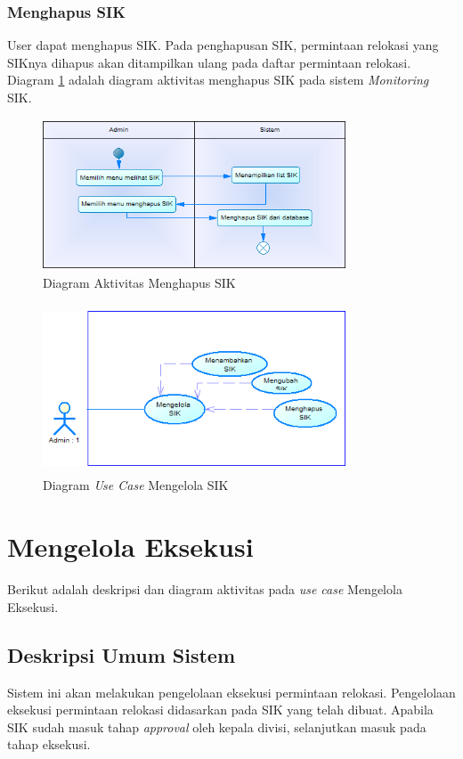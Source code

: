 	\subsubsection{Menghapus SIK}
	User dapat menghapus SIK. Pada penghapusan SIK, permintaan relokasi yang SIKnya dihapus akan ditampilkan ulang pada daftar permintaan relokasi. Diagram \ref{figure:activity_menghapus_sik} adalah diagram aktivitas menghapus SIK pada sistem \textit{Monitoring } SIK.
	\begin{figure}[h]
	\centerline {\includegraphics[width=9cm,height=4.5cm]{bab4/ActivityDiagram_MenghapusSIK.png}}
	\caption{Diagram Aktivitas Menghapus SIK}
	\label{figure:activity_menghapus_sik}
	\end{figure}		

	\begin{figure}[h]
	\centerline {\includegraphics[width=9cm,height=5cm]{bab4/use-case-mengelola-sik.png}}
	\caption{Diagram \textit{Use Case} Mengelola SIK}
	\label{figure:use_case_mengelola_sik}
	\end{figure}

\section{Mengelola Eksekusi}
Berikut adalah deskripsi dan diagram aktivitas pada \textit{use case} Mengelola Eksekusi.
\subsection{Deskripsi Umum Sistem}
\tab Sistem ini akan melakukan pengelolaan eksekusi permintaan relokasi. Pengelolaan eksekusi permintaan relokasi didasarkan pada SIK yang telah dibuat. Apabila SIK sudah masuk tahap \textit{approval} oleh kepala divisi, selanjutkan masuk pada tahap eksekusi.
